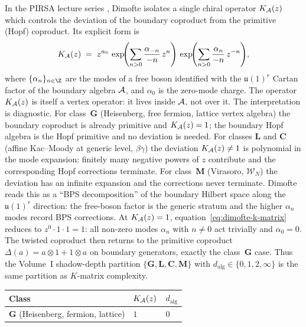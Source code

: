 \begin{remark}
\label{rem:dimofte-k-matrix}
In the PIRSA lecture series \cite{Dimofte25}, Dimofte isolates a single chiral operator $K_{\mathcal{A}}(z)$ which controls the deviation of the boundary coproduct from the primitive (Hopf) coproduct. Its explicit form is
\begin{equation}
\label{eq:dimofte-k-matrix}
K_{\mathcal{A}}(z) \;=\; z^{\alpha_0}\,\exp\!\Biggl(\sum_{n>0} \frac{\alpha_{-n}}{-n}\, z^{n}\Biggr)\,\exp\!\Biggl(\sum_{n>0} \frac{\alpha_{n}}{-n}\, z^{-n}\Biggr),
\end{equation}
where $\{\alpha_n\}_{n\in\Z}$ are the modes of a free boson identified with the $\mathfrak{u}(1)^r$ Cartan factor of the boundary algebra $\mathcal{A}$, and $\alpha_0$ is the zero-mode charge. The operator $K_{\mathcal{A}}(z)$ is itself a vertex operator: it lives inside $\mathcal{A}$, not over it.
The interpretation is diagnostic. For class~$\mathbf{G}$ (Heisenberg, free fermion, lattice vertex algebra) the boundary coproduct is already primitive and $K_{\mathcal{A}}(z) = 1$; the boundary Hopf algebra is the Hopf primitive and no deviation is needed. For classes $\mathbf{L}$ and $\mathbf{C}$ (affine Kac--Moody at generic level, $\beta\gamma$) the deviation $K_{\mathcal{A}}(z) \neq 1$ is polynomial in the mode expansion: finitely many negative powers of $z$ contribute and the corresponding Hopf corrections terminate. For class~$\mathbf{M}$ (Virasoro, $\mathcal{W}_N$) the deviation has an infinite expansion and the corrections never terminate. Dimofte reads this as a ``BPS decomposition'' of the boundary Hilbert space along the $\mathfrak{u}(1)^r$ direction: the free-boson factor is the generic stratum and the higher $\alpha_n$ modes record BPS corrections.
At $K_{\mathcal{A}}(z) = 1$, equation~\eqref{eq:dimofte-k-matrix} reduces to
$z^0 \cdot 1 \cdot 1 = 1$: all non-zero modes $\alpha_n$ with
$n\neq 0$ act trivially and $\alpha_0 = 0$. The twisted coproduct then
returns to the primitive coproduct
$\Delta(a)=a\otimes 1+1\otimes a$ on boundary generators, exactly the
class~$\mathbf G$ case. Thus the Volume~I shadow-depth partition
$\{\mathbf{G},\mathbf{L},\mathbf{C},\mathbf{M}\}$ with
$d_{\mathrm{alg}}\in\{0,1,2,\infty\}$ is the same partition as
$K$-matrix complexity.
\begin{center}
\renewcommand{\arraystretch}{1.2}
\begin{tabular}{lll}
\toprule
Class & $K_{\mathcal{A}}(z)$ & $d_{\mathrm{alg}}$ \\
\midrule
$\mathbf{G}$ (Heisenberg, fermion, lattice) & $1$ & $0$ \\

\end{tabular}
\end{center}
\end{remark}
